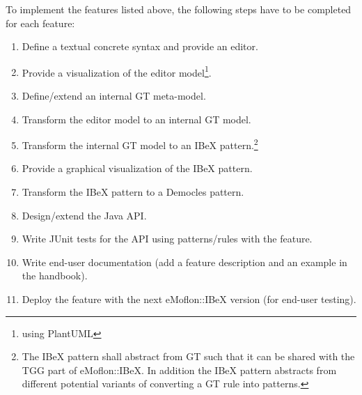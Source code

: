 To implement the features listed above, the following steps have to be completed for each feature:
\begin{enumerate}
	\item Define a textual concrete syntax and provide an editor.
	\item Provide a visualization of the editor model\footnote{\eg using PlantUML}.
	\item Define/extend an internal GT meta-model.
	\item Transform the editor model to an internal GT model.
	\item Transform the internal GT model to an IBeX pattern.\footnote{The IBeX pattern shall abstract from GT such that it can be shared with the TGG part of eMoflon::IBeX.
	In addition the IBeX pattern abstracts from different potential variants of converting a GT rule into patterns.}
	\item Provide a graphical visualization of the IBeX pattern.
	\item Transform the IBeX pattern to a Democles pattern.
	\item Design/extend the Java API.
	\item Write JUnit tests for the API using patterns/rules with the feature.
	\item Write end-user documentation (\ie add a feature description and an example in the handbook).
	\item Deploy the feature with the next eMoflon::IBeX version (for end-user testing).
\end{enumerate}
